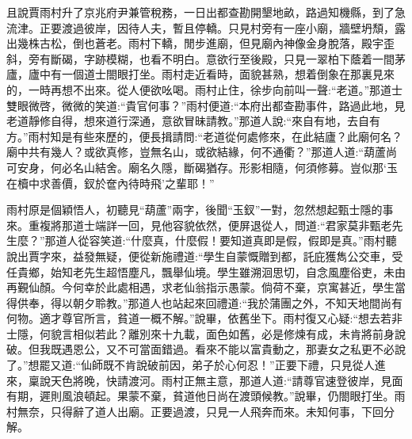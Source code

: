 \begin{parag}
    且說賈雨村升了京兆府尹兼管稅務，一日出都查勘開墾地畝，路過知機縣，到了急流津。正要渡過彼岸，因待人夫，暫且停轎。只見村旁有一座小廟，牆壁坍頹，露出幾株古松，倒也蒼老。雨村下轎，閒步進廟，但見廟內神像金身脫落，殿宇歪斜，旁有斷碣，字跡模糊，也看不明白。意欲行至後殿，只見一翠柏下蔭着一間茅廬，廬中有一個道士閤眼打坐。雨村走近看時，面貌甚熟，想着倒象在那裏見來的，一時再想不出來。從人便欲吆喝。雨村止住，徐步向前叫一聲:“老道。”那道士雙眼微啓，微微的笑道:“貴官何事？”雨村便道:“本府出都查勘事件，路過此地，見老道靜修自得，想來道行深通，意欲冒昧請教。”那道人說:“來自有地，去自有方。”雨村知是有些來歷的，便長揖請問:“老道從何處修來，在此結廬？此廟何名？廟中共有幾人？或欲真修，豈無名山，或欲結緣，何不通衢？”那道人道:“葫蘆尚可安身，何必名山結舍。廟名久隱，斷碣猶存。形影相隨，何須修募。豈似那‘玉在櫝中求善價，釵於奩內待時飛’之輩耶！”
\end{parag}


\begin{parag}
    雨村原是個穎悟人，初聽見“葫蘆”兩字，後聞“玉釵”一對，忽然想起甄士隱的事來。重複將那道士端詳一回，見他容貌依然，便屏退從人，問道:“君家莫非甄老先生麼？”那道人從容笑道:“什麼真，什麼假！要知道真即是假，假即是真。”雨村聽說出賈字來，益發無疑，便從新施禮道:“學生自蒙慨贈到都，託庇獲雋公交車，受任貴鄉，始知老先生超悟塵凡，飄舉仙境。學生雖溯洄思切，自念風塵俗吏，未由再覲仙顏。今何幸於此處相遇，求老仙翁指示愚蒙。倘荷不棄，京寓甚近，學生當得供奉，得以朝夕聆教。”那道人也站起來回禮道:“我於蒲團之外，不知天地間尚有何物。適才尊官所言，貧道一概不解。”說畢，依舊坐下。雨村復又心疑:“想去若非士隱，何貌言相似若此？離別來十九載，面色如舊，必是修煉有成，未肯將前身說破。但我既遇恩公，又不可當面錯過。看來不能以富貴動之，那妻女之私更不必說了。”想罷又道:“仙師既不肯說破前因，弟子於心何忍！”正要下禮，只見從人進來，稟說天色將晚，快請渡河。雨村正無主意，那道人道:“請尊官速登彼岸，見面有期，遲則風浪頓起。果蒙不棄，貧道他日尚在渡頭候教。”說畢，仍閤眼打坐。雨村無奈，只得辭了道人出廟。正要過渡，只見一人飛奔而來。未知何事，下回分解。
\end{parag}